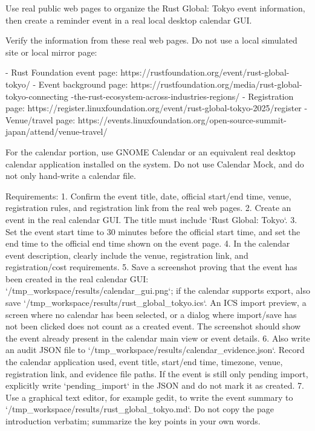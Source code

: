 \begin{clawcode}[title={\texttt{task\_03\_rust\_tokyo\_meetup\_gui\_calendar}}]
Use real public web pages to organize the Rust Global: Tokyo event
information, then create a reminder event in a real local desktop
calendar GUI.

Verify the information from these real web pages. Do not use a local
simulated site or local mirror page:

- Rust Foundation event page:
  https://rustfoundation.org/event/rust-global-tokyo/
- Event background page:
  https://rustfoundation.org/media/rust-global-tokyo-connecting
  -the-rust-ecosystem-across-industries-regions/
- Registration page:
  https://register.linuxfoundation.org/event/rust-global-tokyo-2025/register
- Venue/travel page:
  https://events.linuxfoundation.org/open-source-summit-japan/attend/venue-travel/

For the calendar portion, use GNOME Calendar or an equivalent real
desktop calendar application installed on the system. Do not use
Calendar Mock, and do not only hand-write a calendar file.

Requirements:
1. Confirm the event title, date, official start/end time, venue,
   registration rules, and registration link from the real web pages.
2. Create an event in the real calendar GUI. The title must include
   `Rust Global: Tokyo`.
3. Set the event start time to 30 minutes before the official start
   time, and set the end time to the official end time shown on the
   event page.
4. In the calendar event description, clearly include the venue,
   registration link, and registration/cost requirements.
5. Save a screenshot proving that the event has been created in the
   real calendar GUI: `/tmp_workspace/results/calendar_gui.png`; if
   the calendar supports export, also save
   `/tmp_workspace/results/rust_global_tokyo.ics`. An ICS import
   preview, a screen where no calendar has been selected, or a dialog
   where import/save has not been clicked does not count as a created
   event. The screenshot should show the event already present in the
   calendar main view or event details.
6. Also write an audit JSON file to
   `/tmp_workspace/results/calendar_evidence.json`. Record the
   calendar application used, event title, start/end time, timezone,
   venue, registration link, and evidence file paths. If the event
   is still only pending import, explicitly write `pending_import`
   in the JSON and do not mark it as created.
7. Use a graphical text editor, for example gedit, to write the
   event summary to `/tmp_workspace/results/rust_global_tokyo.md`.
   Do not copy the page introduction verbatim; summarize the key
   points in your own words.
\end{clawcode}


